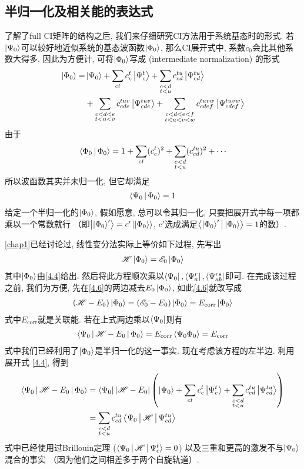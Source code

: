 \subsection{半归一化及相关能的表达式}
了解了full CI矩阵的结构之后, 我们来仔细研究CI方法用于系统基态时的形式. 若$\Ket{\Psi_0}$可以较好地近似系统的基态波函数$\Ket{\Phi_0}$, 那么CI展开式中, 系数$c_0$会比其他系数大得多. 因此为方便计, 可将$\Ket{\Phi_0}$写成\emph{} (intermediate normalization) 的形式
\begin{align}
\label{4.4}
\Ket{\Phi_0} =& \Ket{\Psi_0} + \sum_{ct}c_c^t\Ket{\Psi_c^t} + \sum_{\substack{c<d\\t<u}} c_{cd}^{tu}\Ket{\Psi_{cd}^{tu}}\notag\\
&+\sum_{\substack{c<d<e\\t<u<v}} c_{cde}^{tuv}\Ket{\Psi_{cde}^{tuv}} +\sum_{\substack{c<d<e<f\\t<u<v<w}} c_{cdef}^{tuvw}\Ket{\Psi_{cdef}^{tuvw}}
\end{align}
由于
\begin{align}
\Braket{\Phi_0|\Phi_0} = 1 + \sum_{ct}(c_c^t)^2 + \sum_{\substack{c<d\\t<u}} (c_{cd}^{tu})^2 + \cdots \notag
\end{align}
所以波函数其实并未归一化, 但它却满足
\begin{align}
\Braket{\Psi_0|\Phi_0} =1
\end{align}
给定一个半归一化的$\Ket{\Phi_0}$, 假如愿意, 总可以令其归一化, 只要把展开式中每一项都乘以一个常数就行 （即$\Ket{\Ket{\Phi_0}'}=c'\Ket{\Ket{\Phi_0}}$, $c'$选成满足$\Braket{\Ket{\Phi_0}'|\Ket{\Phi_0}}=1$的数）.

\ref{chap1}已经讨论过, 线性变分法实际上等价如下过程, 先写出
\begin{align}
\mathscr{H}\Ket{\Phi_0} = \mathscr{E}_0\Ket{\Phi_0}
\end{align}
其中$ \Ket{\Phi_0} $由\eqref{4.4}给出. 然后将此方程顺次乘以$ \Bra{\Psi_0},\Bra{\Psi_a^r} ,\Bra{\Psi_{ab}^{rs}}$即可. 在完成该过程之前, 我们为方便, 先在\eqref{4.6}的两边减去$ E_0\Ket{\Phi_0} $, 如此\eqref{4.6}就改写成
\begin{align}
(\mathscr{H} -E_0)\Ket{\Phi_0} = (\mathscr{E}_0-E_0)\Ket{\Phi_0} = E_\mathrm{corr} \Ket{\Phi_0}
\end{align} 
式中$E_\mathrm{corr}$就是关联能. 若在上式两边乘以$\Bra{\Psi_0}$则有
\begin{align}
\Braket{\Psi_0|\mathscr{H}-E_0|\Phi_0} = E_\mathrm{corr} \Braket{\Psi_0\Phi_0} = E_\mathrm{corr}
\end{align}
式中我们已经利用了$\Ket{\Phi_0}$是半归一化的这一事实. 现在考虑该方程的左半边. 利用展开式 \eqref{4.4}, 得到
\begin{align}
\Braket{\Psi_0|\mathscr{H}-E_0|\Phi_0} & = \Bra{\Psi_0}|\mathscr{H}-E_0|\left( \Ket{\Psi_0} + \sum_{ct}c_c^t\Ket{\Psi_c^t} + \sum_{\substack{c<d\\t<u}} c_{cd}^{tu}\Ket{\Psi_{cd}^{tu}} \right)\notag \\
&=\sum_{\substack{c<d\\t<u}}c_{cd}^{tu}\Braket{\Psi_0|\mathscr{H}|\Psi_{cd}^{tu}}
\end{align}
式中已经使用过Brillouin定理 ($ \Braket{\Psi_0|\mathscr{H}|\Psi_c^t }=0$) 以及三重和更高的激发不与$\Ket{\Psi_0}$混合的事实 （因为他们之间相差多于两个自旋轨道）. 
